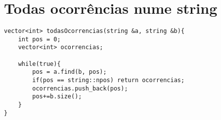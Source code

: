 \section{Todas ocorrências nume string}
\begin{lstlisting}
vector<int> todasOcorrencias(string &a, string &b){
	int pos = 0;
	vector<int> ocorrencias;
	
	while(true){
		pos = a.find(b, pos);
		if(pos == string::npos) return ocorrencias;
		ocorrencias.push_back(pos);
		pos+=b.size();		
	}
}
\end{lstlisting}